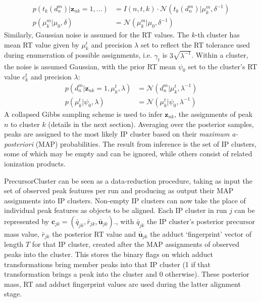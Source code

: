 \begin{align}
p(t_k(d_n^m)\vert\boldsymbol{z}_{nk}=1,...) &= I(n,t, k) \cdot \mathcal{N}(t_k(d_n^m) \vert \mu_k^m,\delta^{-1}) \label{eq:mass-term-pc} \\
p(\mu_k^m\vert \mu_0,\delta) &= \mathcal{N}(\mu_k^m \vert \mu_0,\delta^{-1}) \label{eq:mass-prior-pc}
\end{align}
Similarly, Gaussian noise is assumed for the RT values. The $k$-th cluster has mean RT value given by $\mu_k^t$ and precision $\lambda$ set to reflect the RT tolerance used during enumeration of possible assignments, i.e. $\gamma_t$ is $3\sqrt{\lambda^{-1}}$. Within a cluster, the noise is assumed Gaussian, with the prior RT mean $\psi_0$ set to the cluster's RT value $c_k^t$ and precision $\lambda$:
\begin{align}
p(d_n^m\vert\boldsymbol{z}_{nk}=1,\mu_k^t,\lambda) &= \mathcal{N}(d_n^m \vert \mu_k^t,\lambda^{-1}) \label{eq:rt-term-pc}\\
p(\mu_k^t\vert \psi_0,\lambda) &= \mathcal{N}(\mu_k^t \vert \psi_0,\lambda^{-1}) \label{eq:rt-prior-pc}
\end{align}
A collapsed Gibbs sampling scheme is used to infer $\boldsymbol{z}_{nk}$, the assignments of peak $n$ to cluster $k$ (details in the next section). Averaging over the posterior samples, peaks are assigned to the most likely IP cluster based on their \textit{maximum a-posteriori} (MAP) probabilities. The result from inference is the set of IP clusters, some of which may be empty and can be ignored, while others consist of related ionization products. 

PrecursorCluster can be seen as a data-reduction procedure, taking as input the set of observed peak features per run and producing as output their MAP assignments into IP clusters. Non-empty IP clusters can now take the place of individual peak features as objects to be aligned. Each IP cluster in run $j$ can be represented by $\boldsymbol{c}_{jk}=({\bar{q}}_{jk}, {\bar{r}}_{jk}, \boldsymbol{\bar{u}}_{jk})$., with ${\bar{q}}_{jk}$ the IP cluster's posterior precursor mass value, ${\bar{r}}_{jk}$ the posterior RT value and $\boldsymbol{\bar{u}}_{jk}$ the adduct `fingerprint' vector of length $T$ for that IP cluster, created after the MAP assignments of observed peaks into the cluster. This stores the binary flags on which adduct transformations bring member peaks into that IP cluster (1 if that transformation brings a peak into the cluster and 0 otherwise). These posterior mass, RT and adduct fingerprint values are used during the latter alignment stage.

